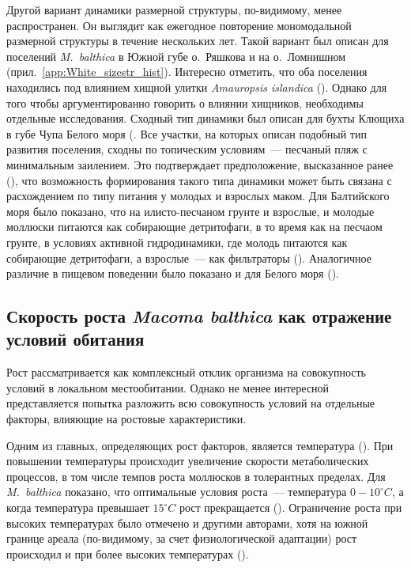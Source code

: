 Другой вариант динамики размерной структуры, по-видимому, менее распространен.
Он выглядит как ежегодное повторение мономодальной размерной структуры в течение нескольких лет.
Такой вариант был описан для поселений \textit{M.~balthica} в Южной губе о.~Ряшкова и на о.~Ломнишном (прил.~\ref{app:White_sizestr_hist}).
Интересно отметить, что оба поселения находились под влиянием хищной улитки \textit{Amauropsis islandica} (\cite{Aristov_Granovich_2011}).
Однако для того чтобы аргументированно говорить о влиянии хищников, необходимы отдельные исследования.
Сходный тип динамики был описан для бухты Клющиха в губе Чупа Белого моря (\cite{Maximovich_et_al_1991, Gerasimova_Maximovich_2013}.
Все участки, на которых описан подобный тип развития поселения, сходны по топическим условиям~--- песчаный пляж с минимальным заилением.
Это подтверждает предположение, высказанное ранее (\cite{Gerasimova_Maximovich_2013}), что возможность формирования такого типа динамики может быть связана с расхождением по типу питания у молодых и взрослых маком.
Для Балтийского моря было показано, что на илисто-песчаном грунте и взрослые, и молодые моллюски питаются как собирающие детритофаги, в то время как на песчаом грунте, в условиях активной гидродинамики, где молодь питаются как собирающие детритофаги, а взрослые~--- как фильтраторы (\cite{Olafsson_1989}). 
Аналогичное различие в пищевом поведении было показано и для Белого моря (\cite{Gerasimova_1988}).

\afterpage{\clearpage}

		\subsection{Скорость роста {\it Macoma balthica} как отражение условий обитания}

Рост рассматривается как комплексный отклик организма на совокупность условий в локальном местообитании. 
Однако не менее интересной представляется попытка разложить всю совокупность условий на отдельные факторы, влияющие на ростовые характеристики. 

Одним из главных, определяющих рост факторов, является температура (\cite{Gilbert_1973, De_Wilde_1975, Bachelet_1980}). 
При повышении температуры происходит увеличение скорости метаболических процессов, в том числе темпов роста моллюсков в толерантных пределах.  
Для {\it M.~balthica} показано, что оптимальные условия роста~--- температура $0 - 10^{\circ} C$, а когда температура превышает $15^{\circ} C$ рост прекращается (\cite{De_Wilde_1975}). 
Ограничение роста при высоких температурах было отмечено и другими авторами, хотя на южной границе ареала (по-видимому, за счет физиологической адаптации) рост происходил и при более высоких температурах (\cite{Bachelet_1980}).

